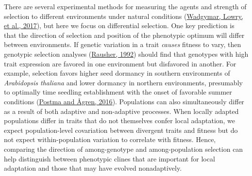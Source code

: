 \documentclass[
  12pt,
]{article}
\begin{document}
There are several experimental methods for measuring the agents and strength of selection to different environments under natural conditions (\protect\hyperlink{ref-wadgymar_identifying_2017}{Wadgymar, Lowry, et al., 2017}), but here we focus on differential selection. One key prediction is that the direction of selection and position of the phenotypic optimum will differ between environments. If genetic variation in a trait \emph{causes} fitness to vary, then genotypic selection analyses (\protect\hyperlink{ref-rausher_measurement_1992}{Rausher, 1992}) should find that genotypes with high trait expression are favored in one environment but disfavored in another. For example, selection favors higher seed dormancy in southern environments of \emph{Arabidopsis thaliana} and lower dormancy in northern environments, presumably to optimally time seedling establishment with the onset of favorable summer conditions (\protect\hyperlink{ref-postma_early_2016}{Postma and Ågren, 2016}). Populations can also simultaneously differ as a result of both adaptive and non-adaptive processes. When locally adapted populations differ in traits that do not themselves confer local adaptation, we expect population-level covariation between divergent traits and fitness but do not expect within-population variation to correlate with fitness. Hence, comparing the direction of among-genotype and among-population selection can help distinguish between phenotypic clines that are important for local adaptation and those that may have evolved nonadaptively.
\end{document}
